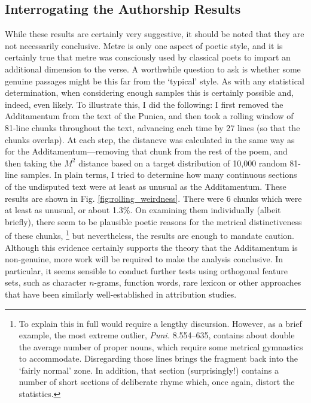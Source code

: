 \documentclass[11pt,a4paper]{scrartcl} %
\begin{document}
{\subsection{Interrogating the Authorship Results}

While these results are certainly very suggestive, it should be noted that they are not necessarily conclusive. Metre is only one aspect of poetic style, and it is certainly true that metre was consciously used by classical poets to impart an additional dimension to the verse. A worthwhile question to ask is whether some genuine passages might be this far from the `typical' style. As with any statistical determination, when considering enough samples this is certainly possible and, indeed, even likely. To illustrate this, I did the following: I first removed the Additamentum from the text of the Punica, and then took a rolling window of 81-line chunks throughout the text, advancing each time by 27 lines (so that the chunks overlap). At each step, the distancve was calculated in the same way as for the Additamentum---removing that chunk from the rest of the poem, and then taking the $M^{2}$ distance based on a target distribution of 10,000 random 81-line samples. In plain terms, I tried to determine how many continuous sections of the undisputed text were at least as unusual as the Additamentum. These results are shown in Fig. \ref{fig:rolling_weirdness}. There were 6 chunks which were at least as unusual, or about 1.3\%. On examining them individually (albeit briefly), there seem to be plausible poetic reasons for the metrical distinctiveness of these chunks,%
\footnote{To explain this in full would require a lengthy discursion. However, as a brief example, the most extreme outlier, \textit{Puni.} 8.554--635, contains about double the average number of proper nouns, which require some metrical gymnastics to accommodate. Disregarding those lines brings the fragment back into the `fairly normal' zone. In addition, that section (surprisingly!) contains a number of short sections of deliberate rhyme which, once again, distort the statistics.}
but nevertheless, the results are enough to mandate caution. Although this evidence certainly supports the theory that the Additamentum is non-genuine, more work will be required to make the analysis conclusive. In particular, it seems sensible to conduct further tests using orthogonal feature sets, such as character $n$-grams, function words, rare lexicon or other approaches that have been similarly well-established in attribution studies.

}
\end{document}
